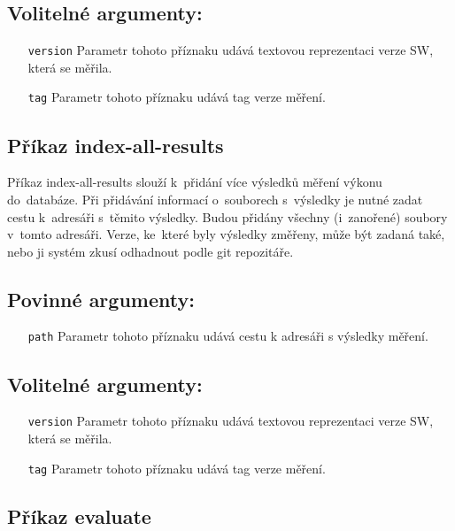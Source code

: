 \subsection*{Volitelné argumenty:}
\begin{itemize}[label=\texttt{\textbf{\textendash}}]
    \item[\texttt{version}] Parametr tohoto příznaku udává textovou reprezentaci verze SW, která se měřila.
    \item[\texttt{tag}] Parametr tohoto příznaku udává tag verze měření.
\end{itemize}

\subsection{Příkaz index-all-results}

Příkaz index-all-results slouží k~přidání více výsledků měření výkonu do~databáze.
Při přidávání informací o~souborech s~výsledky je nutné zadat cestu k~adresáři s~těmito výsledky.
Budou přidány všechny (i~zanořené) soubory v~tomto adresáři.
Verze, ke~které byly výsledky změřeny, může být zadaná také, nebo ji systém zkusí odhadnout
podle git repozitáře.

\subsection*{Povinné argumenty:}
\begin{itemize}[label=\texttt{\textbf{\textendash}}]
    \item[\texttt{path}] Parametr tohoto příznaku udává cestu k adresáři s výsledky měření.
\end{itemize}

\subsection*{Volitelné argumenty:}
\begin{itemize}[label=\texttt{\textbf{\textendash}}]
    \item[\texttt{version}] Parametr tohoto příznaku udává textovou reprezentaci verze SW, která se měřila.
    \item[\texttt{tag}] Parametr tohoto příznaku udává tag verze měření.
\end{itemize}

\subsection{Příkaz evaluate}

